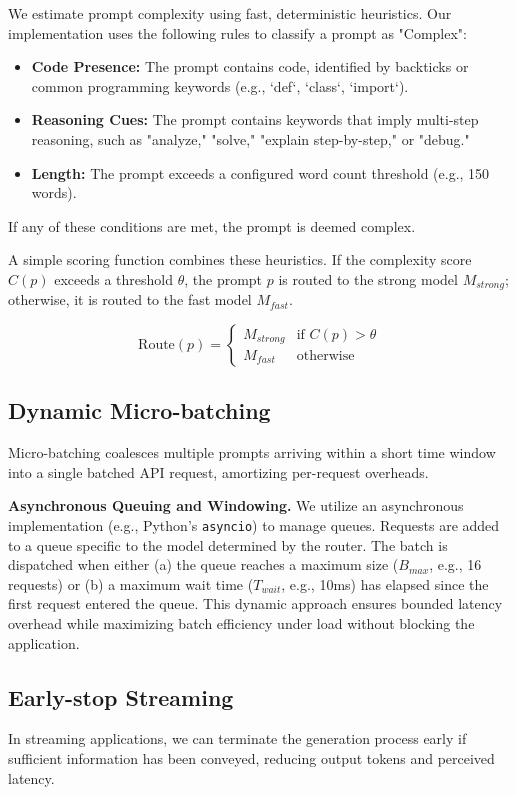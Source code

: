 \documentclass[11pt]{article}
\begin{document}
We estimate prompt complexity using fast, deterministic heuristics. Our implementation uses the following rules to classify a prompt as "Complex":
\begin{itemize}
    \item \textbf{Code Presence:} The prompt contains code, identified by backticks or common programming keywords (e.g., `def`, `class`, `import`).
    \item \textbf{Reasoning Cues:} The prompt contains keywords that imply multi-step reasoning, such as "analyze," "solve," "explain step-by-step," or "debug."
    \item \textbf{Length:} The prompt exceeds a configured word count threshold (e.g., 150 words).
\end{itemize}
If any of these conditions are met, the prompt is deemed complex.

A simple scoring function combines these heuristics. If the complexity score $C(p)$ exceeds a threshold $\theta$, the prompt $p$ is routed to the strong model $M_{strong}$; otherwise, it is routed to the fast model $M_{fast}$.

$$
\text{Route}(p) =
\begin{cases}
  M_{strong} & \text{if } C(p) > \theta \\
  M_{fast} & \text{otherwise}
\end{cases}
$$

\subsection{Dynamic Micro-batching}
Micro-batching coalesces multiple prompts arriving within a short time window into a single batched API request, amortizing per-request overheads.

\noindent\textbf{Asynchronous Queuing and Windowing.} We utilize an asynchronous implementation (e.g., Python's \texttt{asyncio}) to manage queues. Requests are added to a queue specific to the model determined by the router. The batch is dispatched when either (a) the queue reaches a maximum size ($B_{max}$, e.g., 16 requests) or (b) a maximum wait time ($T_{wait}$, e.g., 10ms) has elapsed since the first request entered the queue. This dynamic approach ensures bounded latency overhead while maximizing batch efficiency under load without blocking the application.

\subsection{Early-stop Streaming}
In streaming applications, we can terminate the generation process early if sufficient information has been conveyed, reducing output tokens and perceived latency.
\end{document}
